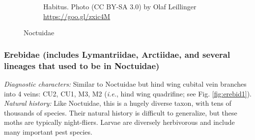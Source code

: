 \documentclass[letterpaper, 11pt]{article}
\begin{document}
\begin{figure}[ht!]
\begin{subfigure}[ht!]{0.37\textwidth}
        \caption{Habitus. Photo (CC BY-SA 3.0) by Olaf Leillinger \url{https://goo.gl/zxic4M}}
        \label{fig:noctuid2}
    \end{subfigure}
    \caption{Noctuidae}\label{fig:noctuids}
\end{figure}

\subsubsection{Erebidae (includes Lymantriidae, Arctiidae, and several lineages that used to be in Noctuidae)}
\noindent{}\textit{Diagnostic characters:} Similar to Noctuidae but hind wing cubital vein branches into 4 veins: CU2, CU1, M3, M2 (\textit{i.e.}, hind wing quadrifine; see Fig. \ref{fig:erebid1}).\\

\noindent{}\textit{Natural history:} Like Noctuidae, this is a hugely diverse taxon, with tens of thousands of species. Their natural history is difficult to generalize, but these moths are typically night-fliers. Larvae are diversely herbivorous and include many important pest species.
\end{document}
